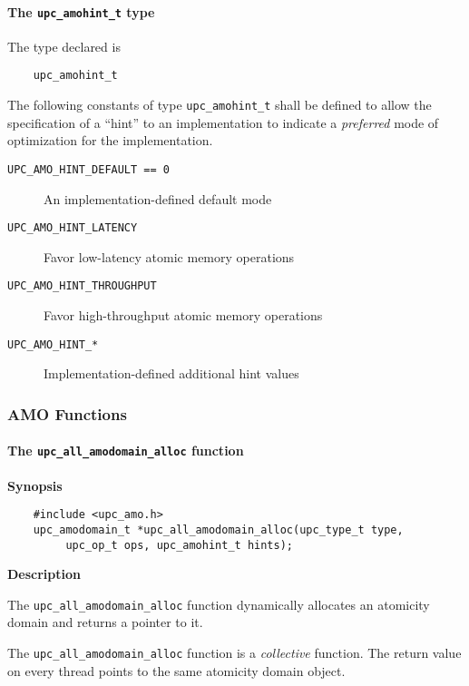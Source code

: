 \paragraph{The {\tt upc\_amohint\_t} type}

\npf The type declared is
\begin{verbatim}
    upc_amohint_t
\end{verbatim}

\np The following constants of type {\tt upc\_amohint\_t} shall be defined
    to allow the specification of a ``hint'' to an implementation to indicate
    a \emph{preferred} mode of optimization for the implementation.
\begin{description}
  \item[{\tt UPC\_AMO\_HINT\_DEFAULT == 0}]
    An implementation-defined default mode
  \item[{\tt UPC\_AMO\_HINT\_LATENCY}]
    Favor low-latency atomic memory operations
  \item[{\tt UPC\_AMO\_HINT\_THROUGHPUT}]
    Favor high-throughput atomic memory operations
  \item[{\tt UPC\_AMO\_HINT\_*}]
    Implementation-defined additional hint values
\end{description}

\subsubsection{AMO Functions}
\label{upc-amo-functions}

\paragraph{The {\tt upc\_all\_amodomain\_alloc} function}

{\bf Synopsis}

\npf\vspace{-1.8em}
\begin{verbatim}
    #include <upc_amo.h>
    upc_amodomain_t *upc_all_amodomain_alloc(upc_type_t type,
         upc_op_t ops, upc_amohint_t hints);
\end{verbatim}

{\bf Description}

\np The {\tt upc\_all\_amodomain\_alloc} function dynamically allocates an
    atomicity domain and returns a pointer to it.

\np The {\tt upc\_all\_amodomain\_alloc} function is a {\em collective} function.
    The return value on every thread points to the same atomicity domain
    object.

